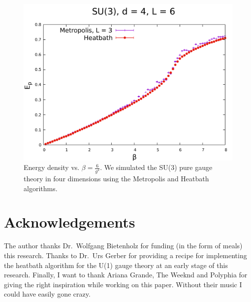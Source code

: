 \documentclass[12pt,a4paper]{article}
\begin{document}
\begin{center}
\begin{figure}
\includegraphics[scale=0.6]{../images/L=6_heatbath_L=3_metropolis.pdf}
\caption{Energy density vs. $\beta = \frac{6}{g^2}$. We simulated the SU(3) pure gauge theory in four dimensions using the Metropolis and Heatbath algorithms.}
\label{fig:Ep}
\end{figure}
\end{center}
\section{Acknowledgements}
The author thanks Dr.\ Wolfgang Bietenholz for funding (in the form of meals) this research. Thanks to Dr.\ Urs Gerber for providing a recipe for implementing the heatbath algorithm for the U(1) gauge theory at an early stage of this research. Finally, I want to thank Ariana Grande, The Weeknd and Polyphia for giving the right inspiration while working on this paper. Without their music I could have easily gone crazy.
\end{document}
